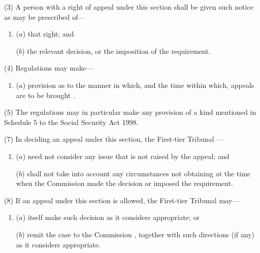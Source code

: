 \documentclass[12pt,a4paper]{article}
\begin{document}
(3) A person with a right of appeal under this section shall be given such notice as may be prescribed of—
\begin{enumerate}\item[]
($a$) that right; and

($b$) the relevant decision, or the imposition of the requirement.
\end{enumerate}

(4) Regulations may make—
\begin{enumerate}\item[]
($a$) provision as to the manner in which, and the time within which, appeals are to be brought%
.
\end{enumerate}

(5) The regulations may in particular make any provision of a kind mentioned in Schedule 5 to the Social Security Act 1998. 


(7) In deciding an appeal under this section, 
the First-tier Tribunal%
—
\begin{enumerate}\item[]
($a$) need not consider any issue that is not raised by the appeal; and

($b$) shall not take into account any circumstances not obtaining at the time when the 
Commission  %
made the decision or imposed the requirement.
\end{enumerate}

(8) If an appeal under this section is allowed, the 
First-tier Tribunal  %
may—
\begin{enumerate}\item[]
($a$) itself make such decision as it considers appropriate; or

($b$) remit the case to the 
Commission%
, together with such directions (if any) as it considers appropriate.
\end{enumerate}
\end{document}

